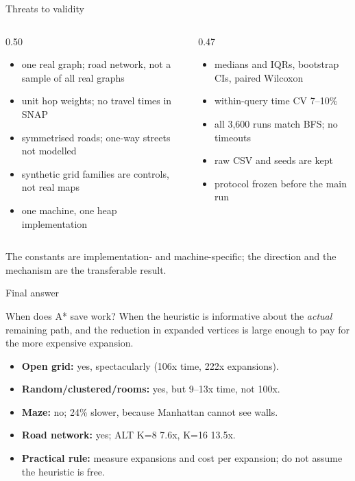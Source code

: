 \documentclass[aspectratio=169,10pt]{beamer}
\begin{document}
\begin{frame}{Threats to validity}
  \begin{columns}[T,onlytextwidth]
    \begin{column}{0.50\textwidth}
      \begin{itemize}
        \item one real graph; road network, not a sample of all real graphs
        \item unit hop weights; no travel times in SNAP
        \item symmetrised roads; one-way streets not modelled
        \item synthetic grid families are controls, not real maps
        \item one machine, one heap implementation
      \end{itemize}
    \end{column}
    \begin{column}{0.47\textwidth}
      \begin{itemize}
        \item medians and IQRs, bootstrap CIs, paired Wilcoxon
        \item within-query time CV 7--10\%
        \item all 3,600 runs match BFS; no timeouts
        \item raw CSV and seeds are kept
        \item protocol frozen before the main run
      \end{itemize}
    \end{column}
  \end{columns}
  \vspace{0.6em}
  \centering
  \small The constants are implementation- and machine-specific; the direction
  and the mechanism are the transferable result.
\end{frame}

\begin{frame}{Final answer}
  \begin{block}{When does A* save work?}
    When the heuristic is informative about the \emph{actual} remaining path,
    and the reduction in expanded vertices is large enough to pay for the
    more expensive expansion.
  \end{block}
  \begin{itemize}
    \item \textbf{Open grid:} yes, spectacularly (106x time, 222x expansions).
    \item \textbf{Random/clustered/rooms:} yes, but 9--13x time, not 100x.
    \item \textbf{Maze:} no; 24\% slower, because Manhattan cannot see walls.
    \item \textbf{Road network:} yes; ALT K=8 7.6x, K=16 13.5x.
    \item \textbf{Practical rule:} measure expansions and cost per expansion;
      do not assume the heuristic is free.
  \end{itemize}
\end{frame}
\end{document}
